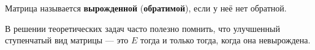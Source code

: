 \begin{definition}
    Матрица называется \textbf{вырожденной} (\textbf{обратимой}), если у неё нет обратной.
\end{definition}

\begin{remark}
    В решении теоретических задач часто полезно помнить, что улучшенный ступенчатый вид матрицы --- это $E$ тогда и только тогда, когда она невырождена.
\end{remark}


